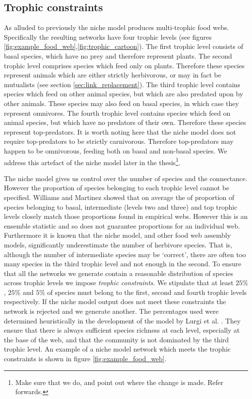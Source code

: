 \subsection{Trophic constraints}
\label{sec:trophic_constraints}

As alluded to previously the niche model produces multi-trophic food webs. Specifically the resulting networks have four trophic levels (see figures \ref{fig:example_food_web},\ref{fig:trophic_cartoon}). The first trophic level consists of basal species, which have no prey and therefore represent plants. The second trophic level comprises species which feed only on plants. Therefore these species represent animals which are either strictly herbivorous, or may in fact be mutualists (see section \ref{sec:link_replacement}). The third trophic level contains species which feed on other animal species, but which are also predated upon by other animals. These species may also feed on basal species, in which case they represent omnivores. The fourth trophic level contains species which feed on animal species, but which have no predators of their own. Therefore these species represent top-predators. It is worth noting here that the niche model does not require top-predators to be strictly carnivorous. Therefore top-predators may happen to be omnivorous, feeding both on basal and non-basal species. We address this artefact of the niche model later in the thesis\footnote{Make sure that we do, and point out where the change is made. Refer forwards.}.

The niche model gives us control over the number of species and the connectance. However the proportion of species belonging to each trophic level cannot be specified. Williams and Martinez \cite{williams2000simple} showed that on average the of proportion of species belonging to basal, intermediate (levels two and three) and top trophic levels closely match those proportions found in empirical webs. However this is an ensemble statistic and so does not guarantee proportions for an individual web. Furthermore it is known that the niche model, and other food web assembly models, significantly underestimate the number of herbivore species\cite{williams2008success}. That is, although the number of intermediate species may be `correct', there are often too many species in the third trophic level and not enough in the second. To ensure that all the networks we generate contain a reasonable distribution of species across trophic levels we impose \emph{trophic constraints}. We stipulate that at least $25\%$, $25\%$ and $5\%$ of species must belong to the first, second and fourth trophic levels respectively. If the niche model output does not meet these constraints the network is rejected and we generate another. The percentages used were determined heuristically in the development of the model by Lurgi et al. \cite{lurgi2015effects}. They ensure that there is always sufficient species richness at each level, especially at the base of the web, and that the community is not dominated by the third trophic level. An example of a niche model network which meets the trophic constraints is shown in figure \ref{fig:example_food_web}.

